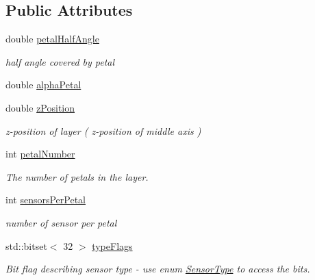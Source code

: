 \subsection*{Public Attributes}
\begin{DoxyCompactItemize}
\item 
double \hyperlink{struct_d_d4hep_1_1_d_d_rec_1_1_z_disk_petals_struct_1_1_layer_layout_a85cf828a62962381c4db27d71a536dfa}{petal\+Half\+Angle}
\begin{DoxyCompactList}\small\item\em half angle covered by petal \end{DoxyCompactList}\item 
double \hyperlink{struct_d_d4hep_1_1_d_d_rec_1_1_z_disk_petals_struct_1_1_layer_layout_a8e5089dc9e7157730d3c3773ed6f285c}{alpha\+Petal}
\item 
double \hyperlink{struct_d_d4hep_1_1_d_d_rec_1_1_z_disk_petals_struct_1_1_layer_layout_a2b501a3aa1eb000afd0c2b15a3fa3ff0}{z\+Position}
\begin{DoxyCompactList}\small\item\em z-\/position of layer ( z-\/position of middle axis ) \end{DoxyCompactList}\item 
int \hyperlink{struct_d_d4hep_1_1_d_d_rec_1_1_z_disk_petals_struct_1_1_layer_layout_a4b7640805517bd0d1cb1d2d6aa3ddb99}{petal\+Number}
\begin{DoxyCompactList}\small\item\em The number of petals in the layer. \end{DoxyCompactList}\item 
int \hyperlink{struct_d_d4hep_1_1_d_d_rec_1_1_z_disk_petals_struct_1_1_layer_layout_af4b922495a14cb54c5d6412ef1097d52}{sensors\+Per\+Petal}
\begin{DoxyCompactList}\small\item\em number of sensor per petal \end{DoxyCompactList}\item 
std\+::bitset$<$ 32 $>$ \hyperlink{struct_d_d4hep_1_1_d_d_rec_1_1_z_disk_petals_struct_1_1_layer_layout_a20e5c894370d93b960dccbb7b31d167c}{type\+Flags}
\begin{DoxyCompactList}\small\item\em Bit flag describing sensor type -\/ use enum \hyperlink{struct_d_d4hep_1_1_d_d_rec_1_1_z_disk_petals_struct_1_1_sensor_type}{Sensor\+Type} to access the bits. \end{DoxyCompactList}\item 

\end{DoxyCompactItemize}
